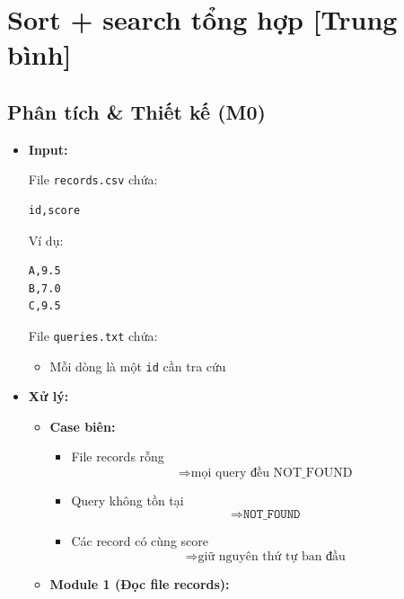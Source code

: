 \section{Sort + search tổng hợp [Trung bình]}
\subsection{Phân tích \& Thiết kế (M0)}

\begin{itemize}

    \item \textbf{Input:}

    File \texttt{records.csv} chứa:

\begin{lstlisting}
id,score
\end{lstlisting}

    Ví dụ:

\begin{lstlisting}
A,9.5
B,7.0
C,9.5
\end{lstlisting}

    File \texttt{queries.txt} chứa:

    \begin{itemize}
        \item Mỗi dòng là một \texttt{id} cần tra cứu
    \end{itemize}

    \item \textbf{Xử lý:}

    \begin{itemize}

        \item \textbf{Case biên:}

        \begin{itemize}
            \item File records rỗng
            \[
                \Rightarrow \text{mọi query đều NOT\_FOUND}
            \]

            \item Query không tồn tại
            \[
                \Rightarrow \texttt{NOT\_FOUND}
            \]

            \item Các record có cùng score
            \[
                \Rightarrow \text{giữ nguyên thứ tự ban đầu}
            \]
        \end{itemize}

        \item \textbf{Module 1 (Đọc file records):}


\end{itemize}
\end{itemize}

